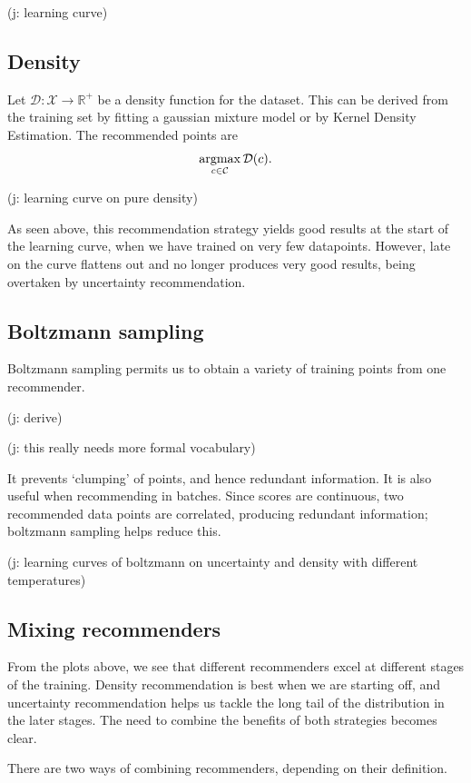 \documentclass[11pt,twoside]{report}
\newcommand\bbR{\mathbb{R}}
\newcommand\cC{\mathcal{C}}
\newcommand\cD{\mathcal{D}}
\newcommand\cX{\mathcal{X}}
\DeclareMathOperator*{\argmax}{argmax}
\newcommand\jakub[1]{{\color{red}(j: #1)}}
\begin{document}
\jakub{learning curve}

\subsection{Density}

Let $\cD : \cX \to \bbR^+$ be a density function for the dataset. This can be derived from the training set by fitting a gaussian mixture model or by Kernel Density Estimation. The recommended points are \[
    \argmax_{c \in \cC} \cD(c) \text.
\]

\jakub{learning curve on pure density}

As seen above, this recommendation strategy yields good results at the start of the learning curve, when we have trained on very few datapoints. However, late on the curve flattens out and no longer produces very good results, being overtaken by uncertainty recommendation.

\subsection{Boltzmann sampling}

Boltzmann sampling permits us to obtain a variety of training points from one recommender.

\jakub{derive}

\jakub{this really needs more formal vocabulary}

It prevents `clumping' of points, and hence redundant information. It is also useful when recommending in batches. Since scores are continuous, two recommended data points are correlated, producing redundant information; boltzmann sampling helps reduce this.

\jakub{learning curves of boltzmann on uncertainty and density with different temperatures}

\subsection{Mixing recommenders}

From the plots above, we see that different recommenders excel at different stages of the training. Density recommendation is best when we are starting off, and uncertainty recommendation helps us tackle the long tail of the distribution in the later stages. The need to combine the benefits of both strategies becomes clear.

There are two ways of combining recommenders, depending on their definition.
\end{document}
